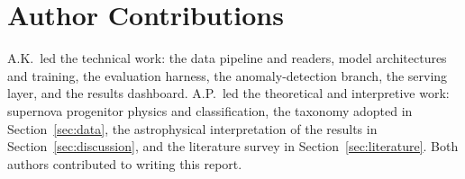 \chapter*{Author Contributions}

A.K.\ led the technical work: the data pipeline and readers, model
architectures and training, the evaluation harness, the anomaly-detection
branch, the serving layer, and the results dashboard. A.P.\ led the
theoretical and interpretive work: supernova progenitor physics and
classification, the taxonomy adopted in Section~\ref{sec:data}, the
astrophysical interpretation of the results in Section~\ref{sec:discussion},
and the literature survey in Section~\ref{sec:literature}. Both authors
contributed to writing this report.
